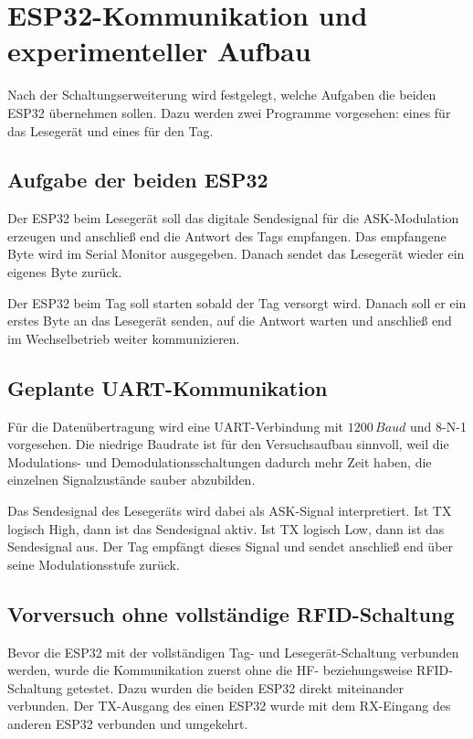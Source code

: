 \section{ESP32-Kommunikation und experimenteller Aufbau}
Nach der Schaltungserweiterung wird festgelegt, welche Aufgaben die beiden ESP32 übernehmen sollen. Dazu werden zwei Programme vorgesehen: eines für das Lesegerät und eines für den Tag.

\subsection{Aufgabe der beiden ESP32}
Der ESP32 beim Lesegerät soll das digitale Sendesignal für die ASK-Modulation erzeugen und anschließ end die Antwort des Tags empfangen. Das empfangene Byte wird im Serial Monitor ausgegeben. Danach sendet das Lesegerät wieder ein eigenes Byte zurück.

Der ESP32 beim Tag soll starten sobald der Tag versorgt wird. Danach soll er ein erstes Byte an das Lesegerät senden, auf die Antwort warten und anschließ end im Wechselbetrieb weiter kommunizieren.

\subsection{Geplante UART-Kommunikation}
Für die Datenübertragung wird eine UART-Verbindung mit $1200\,Baud$ und 8-N-1 vorgesehen. Die niedrige Baudrate ist für den Versuchsaufbau sinnvoll, weil die Modulations- und Demodulationsschaltungen dadurch mehr Zeit haben, die einzelnen Signalzustände sauber abzubilden.

Das Sendesignal des Lesegeräts wird dabei als ASK-Signal interpretiert. Ist TX logisch High, dann ist das Sendesignal aktiv. Ist TX logisch Low, dann ist das Sendesignal aus. Der Tag empfängt dieses Signal und sendet anschließ end über seine Modulationsstufe zurück.

\subsection{Vorversuch ohne vollständige RFID-Schaltung}
Bevor die ESP32 mit der vollständigen Tag- und Lesegerät-Schaltung verbunden werden, wurde die Kommunikation zuerst ohne die HF- beziehungsweise RFID-Schaltung getestet. Dazu wurden die beiden ESP32 direkt miteinander verbunden. Der TX-Ausgang des einen ESP32 wurde mit dem RX-Eingang des anderen ESP32 verbunden und umgekehrt.

